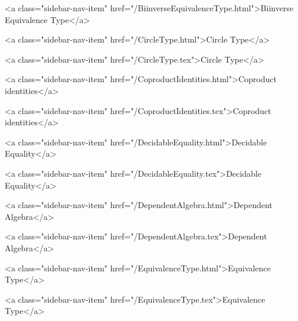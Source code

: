       
    
      
        
          <a class="sidebar-nav-item" href="/BiinverseEquivalenceType.html">Biinverse Equivalence Type</a>
        
      
    
      
        
          <a class="sidebar-nav-item" href="/CircleType.html">Circle Type</a>
        
      
    
      
        
          <a class="sidebar-nav-item" href="/CircleType.tex">Circle Type</a>
        
      
    
      
        
          <a class="sidebar-nav-item" href="/CoproductIdentities.html">Coproduct identities</a>
        
      
    
      
        
          <a class="sidebar-nav-item" href="/CoproductIdentities.tex">Coproduct identities</a>
        
      
    
      
        
          <a class="sidebar-nav-item" href="/DecidableEquality.html">Decidable Equality</a>
        
      
    
      
        
          <a class="sidebar-nav-item" href="/DecidableEquality.tex">Decidable Equality</a>
        
      
    
      
        
          <a class="sidebar-nav-item" href="/DependentAlgebra.html">Dependent Algebra</a>
        
      
    
      
        
          <a class="sidebar-nav-item" href="/DependentAlgebra.tex">Dependent Algebra</a>
        
      
    
      
        
          <a class="sidebar-nav-item" href="/EquivalenceType.html">Equivalence Type</a>
        
      
    
      
        
          <a class="sidebar-nav-item" href="/EquivalenceType.tex">Equivalence Type</a>
        

